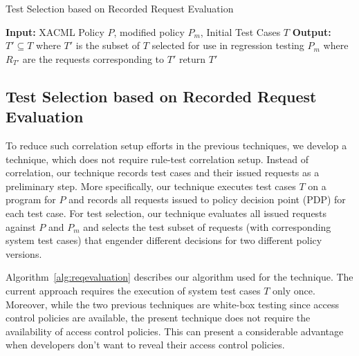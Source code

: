 \begin{algorithmic}
\begin{algorithm}[t]
\caption{\label{alg:reqevaluation}Test Selection based on Recorded Request Evaluation}
\STATE \textbf{Input:} XACML Policy $P$, modified policy $P_{m}$, Initial Test Cases $T$
\STATE \textbf{Output:} $T' \subseteq T$ where $T'$ is the subset of $T$ selected for use in regression testing $P_{m}$
 where $R_{T'}$ are the requests corresponding to $T'$ 
\ENDIF
\ENDFOR
{}
\STATE return $T'$
\end{algorithm}
\end{algorithmic}

\subsection{Test Selection based on Recorded Request Evaluation}
To reduce such correlation setup efforts in the previous techniques, we develop
a technique, which does not require rule-test correlation setup.
Instead of correlation, our technique records test cases and their issued requests as a preliminary step.
More specifically, our technique executes test cases $T$ on a program for $P$ and records all requests issued to policy decision point (PDP) for each test case. For test selection, our technique evaluates all issued requests against $P$ and $P_m$ and selects the test subset of
requests (with corresponding system test cases) that engender different decisions for two different policy versions.

Algorithm~\ref{alg:reqevaluation} describes our algorithm used for the technique.
The current approach requires the execution of system test cases $T$ only once.
Moreover, while the two previous techniques are white-box testing since access control policies are available, the present technique 
does not require the availability of access control policies. This can present a considerable advantage when developers don't want 
to reveal their access control policies.



